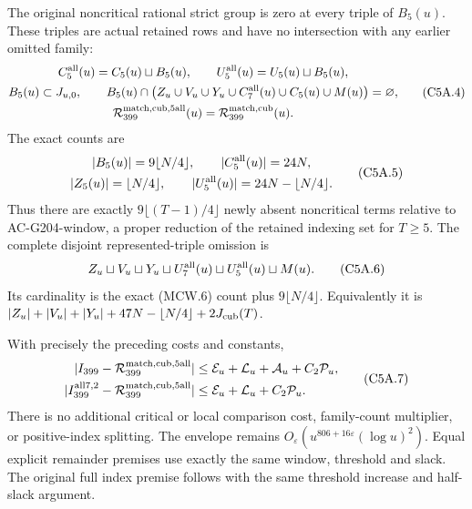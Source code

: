 \begin{theorem}
\label{AC-G206-window}
The original noncritical rational strict group is zero at every
triple of $B_5(u)$. These triples are actual retained rows and
have no intersection with any earlier omitted family:
\[
 \begin{gathered}
 C_5^{\rm all}(u)=C_5(u)\sqcup B_5(u),\qquad
 U_5^{\rm all}(u)=U_5(u)\sqcup B_5(u),\\
 B_5(u)\subset J_{u,0},\qquad
 B_5(u)\cap\bigl(Z_u\cup V_u\cup Y_u\cup C_7^{\rm all}(u)
                            \cup C_5(u)\cup M(u)\bigr)=\varnothing,\\
 \mathcal R_{399}^{\rm match,cub,5all}(u)
                         =\mathcal R_{399}^{\rm match,cub}(u).
 \end{gathered}\tag{C5A.4}
\]
The exact counts are
\[
 \begin{gathered}
 |B_5(u)|=9\lfloor N/4\rfloor,\qquad
 |C_5^{\rm all}(u)|=24N,\\
 |Z_5(u)|=\lfloor N/4\rfloor,\qquad
 |U_5^{\rm all}(u)|=24N-\lfloor N/4\rfloor.
 \end{gathered}\tag{C5A.5}
\]
Thus there are exactly $9\lfloor(T-1)/4\rfloor$ newly absent
noncritical terms relative to AC-G204-window, a proper reduction
of the retained indexing set for $T\geq5$.
The complete disjoint represented-triple omission is
\[
 Z_u\sqcup V_u\sqcup Y_u\sqcup U_7^{\rm all}(u)
                        \sqcup U_5^{\rm all}(u)\sqcup M(u).
 \tag{C5A.6}
\]
Its cardinality is the exact (MCW.6) count plus
$9\lfloor N/4\rfloor$. Equivalently it is
$|Z_u|+|V_u|+|Y_u|+47N-\lfloor N/4\rfloor+2J_{\rm cub}(T)$.

With precisely the preceding costs and constants,
\[
 \begin{aligned}
 |I_{399}-\mathcal R_{399}^{\rm match,cub,5all}|&\leq
          \mathcal E_u+\mathcal L_u+\mathcal A_u+C_2\mathcal P_u,\\
 |I_{399}^{\rm all7,2}-\mathcal R_{399}^{\rm match,cub,5all}|&\leq
          \mathcal E_u+\mathcal L_u+C_2\mathcal P_u.
 \end{aligned}\tag{C5A.7}
\]
There is no additional critical or local comparison cost,
family-count multiplier, or positive-index splitting.
The envelope remains $O_\varepsilon(u^{806+16\varepsilon}(\log u)^2)$.
Equal explicit remainder premises use exactly the same window,
threshold and slack. The original full index premise follows
with the same threshold increase and half-slack argument.
\end{theorem}

